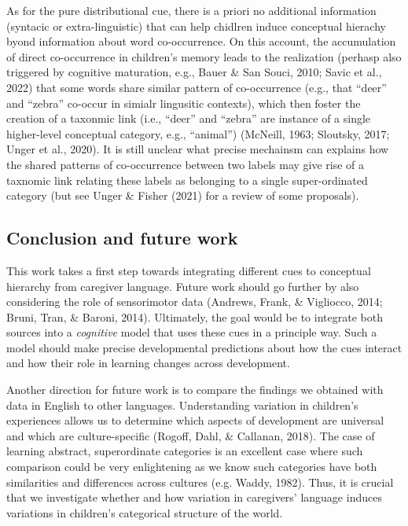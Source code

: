 \documentclass[english,,man]{apa6}
\begin{document}
As for the pure distributional cue, there is a priori no additional information (syntacic or extra-linguistic) that can help chidlren induce conceptual hierachy byond information about word co-occurrence. On this account, the accumulation of direct co-occurrence in children's memory leads to the realization (perhasp also triggered by cognitive maturation, e.g., Bauer \& San Souci, 2010; Savic et al., 2022) that some words share similar pattern of co-occurrence (e.g., that \enquote{deer} and \enquote{zebra} co-occur in simialr lingusitic contexts), which then foster the creation of a taxonmic link (i.e., \enquote{deer} and \enquote{zebra} are instance of a single higher-level conceptual category, e.g., \enquote{animal}) (McNeill, 1963; Sloutsky, 2017; Unger et al., 2020). It is still unclear what precise mechainsm can explains how the shared patterns of co-occurrence between two labels may give rise of a taxnomic link relating these labels as belonging to a single super-ordinated category (but see Unger \& Fisher (2021) for a review of some proposals).

\hypertarget{conclusion-and-future-work}{%
\subsection{Conclusion and future work}\label{conclusion-and-future-work}}

This work takes a first step towards integrating different cues to conceptual hierarchy from caregiver language. Future work should go further by also considering the role of sensorimotor data (Andrews, Frank, \& Vigliocco, 2014; Bruni, Tran, \& Baroni, 2014). Ultimately, the goal would be to integrate both sources into a \emph{cognitive} model that uses these cues in a principle way. Such a model should make precise developmental predictions about how the cues interact and how their role in learning changes across development.

Another direction for future work is to compare the findings we obtained with data in English to other languages. Understanding variation in children's experiences allows us to determine which aspects of development are universal and which are culture-specific (Rogoff, Dahl, \& Callanan, 2018). The case of learning abstract, superordinate categories is an excellent case where such comparison could be very enlightening as we know such categories have both similarities and differences across cultures (e.g. Waddy, 1982). Thus, it is crucial that we investigate whether and how variation in caregivers' language induces variations in children's categorical structure of the world.
\end{document}
